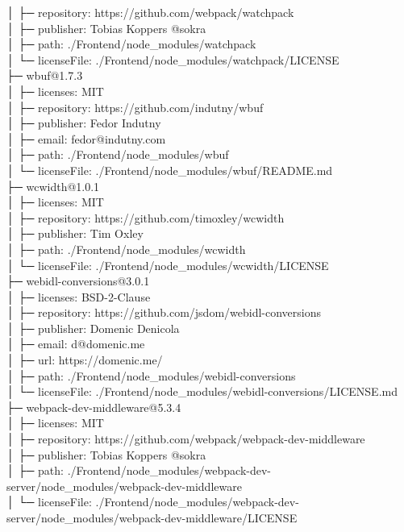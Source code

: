 │  ├─ repository: https://github.com/webpack/watchpack\\
│  ├─ publisher: Tobias Koppers @sokra\\
│  ├─ path: ./Frontend/node\_modules/watchpack\\
│  └─ licenseFile: ./Frontend/node\_modules/watchpack/LICENSE\\
├─ wbuf@1.7.3\\
│  ├─ licenses: MIT\\
│  ├─ repository: https://github.com/indutny/wbuf\\
│  ├─ publisher: Fedor Indutny\\
│  ├─ email: fedor@indutny.com\\
│  ├─ path: ./Frontend/node\_modules/wbuf\\
│  └─ licenseFile: ./Frontend/node\_modules/wbuf/README.md\\
├─ wcwidth@1.0.1\\
│  ├─ licenses: MIT\\
│  ├─ repository: https://github.com/timoxley/wcwidth\\
│  ├─ publisher: Tim Oxley\\
│  ├─ path: ./Frontend/node\_modules/wcwidth\\
│  └─ licenseFile: ./Frontend/node\_modules/wcwidth/LICENSE\\
├─ webidl-conversions@3.0.1\\
│  ├─ licenses: BSD-2-Clause\\
│  ├─ repository: https://github.com/jsdom/webidl-conversions\\
│  ├─ publisher: Domenic Denicola\\
│  ├─ email: d@domenic.me\\
│  ├─ url: https://domenic.me/\\
│  ├─ path: ./Frontend/node\_modules/webidl-conversions\\
│  └─ licenseFile: ./Frontend/node\_modules/webidl-conversions/LICENSE.md\\
├─ webpack-dev-middleware@5.3.4\\
│  ├─ licenses: MIT\\
│  ├─ repository: https://github.com/webpack/webpack-dev-middleware\\
│  ├─ publisher: Tobias Koppers @sokra\\
│  ├─ path: ./Frontend/node\_modules/webpack-dev-server/node\_modules/webpack-dev-middleware\\
│  └─ licenseFile: ./Frontend/node\_modules/webpack-dev-server/node\_modules/webpack-dev-middleware/LICENSE\\
